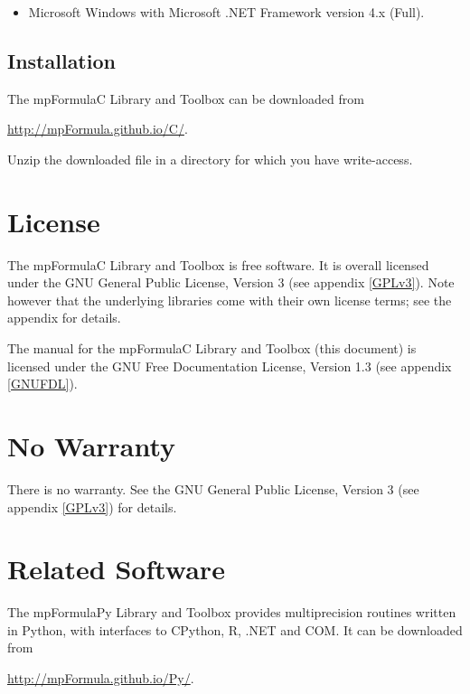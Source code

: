 \begin{itemize}
  \item Microsoft Windows with Microsoft .NET Framework version 4.x (Full).
\end{itemize}



\subsection{Installation}
\label{Installation}
The mpFormulaC Library and Toolbox can be downloaded from 

\vpara
\href{http://mpFormula.github.io/C/}{http://mpFormula.github.io/C/}. 

\vpara
Unzip the downloaded file in a directory for which you have write-access.




\section{License}
\label{mpFormulaLicense}

The mpFormulaC Library and Toolbox is free software. It is overall licensed under the GNU General Public License, Version 3 (see appendix \ref{GPLv3}). Note however that the underlying libraries come with their own license terms; see the appendix for details.

The manual for the mpFormulaC Library and Toolbox (this document) is licensed under the GNU Free Documentation License, Version 1.3 (see appendix \ref{GNUFDL}).




\section{No Warranty}
\label{No Warranty} 

There is no warranty. See the GNU General Public License, Version 3 (see appendix \ref{GPLv3}) for details.


\section{Related Software}

The mpFormulaPy Library and Toolbox provides multiprecision routines written in Python, with interfaces to CPython, R, .NET and COM. It can be downloaded from 

\href{http://mpFormula.github.io/Py/}{http://mpFormula.github.io/Py/}. 


